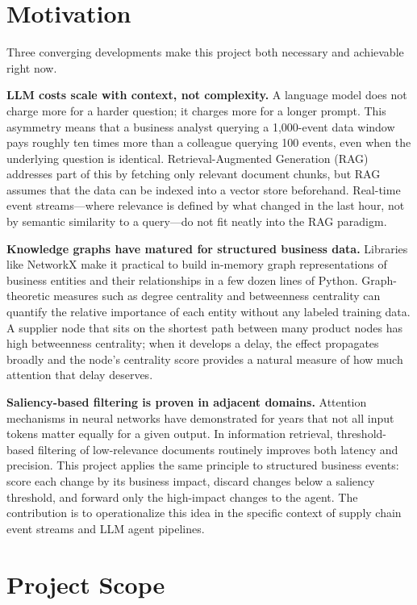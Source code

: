 \section{Motivation}
\label{sec:motivation}

Three converging developments make this project both necessary and achievable right now.

\textbf{LLM costs scale with context, not complexity.}
A language model does not charge more for a harder question; it charges more for a longer
prompt. This asymmetry means that a business analyst querying a 1,000-event data window
pays roughly ten times more than a colleague querying 100 events, even when the underlying
question is identical. Retrieval-Augmented Generation (RAG) addresses part of this by
fetching only relevant document chunks, but RAG assumes that the data can be indexed into
a vector store beforehand. Real-time event streams---where relevance is defined by what
changed in the last hour, not by semantic similarity to a query---do not fit neatly into
the RAG paradigm.

\textbf{Knowledge graphs have matured for structured business data.}
Libraries like NetworkX make it practical to build in-memory graph representations of
business entities and their relationships in a few dozen lines of Python. Graph-theoretic
measures such as degree centrality and betweenness centrality can quantify the relative
importance of each entity without any labeled training data. A supplier node that sits on
the shortest path between many product nodes has high betweenness centrality; when it
develops a delay, the effect propagates broadly and the node's centrality score provides
a natural measure of how much attention that delay deserves.

\textbf{Saliency-based filtering is proven in adjacent domains.}
Attention mechanisms in neural networks have demonstrated for years that not all input
tokens matter equally for a given output. In information retrieval, threshold-based
filtering of low-relevance documents routinely improves both latency and precision.
This project applies the same principle to structured business events: score each
change by its business impact, discard changes below a saliency threshold, and forward
only the high-impact changes to the agent. The contribution is to operationalize this
idea in the specific context of supply chain event streams and LLM agent pipelines.

\section{Project Scope}
\label{sec:scope}

